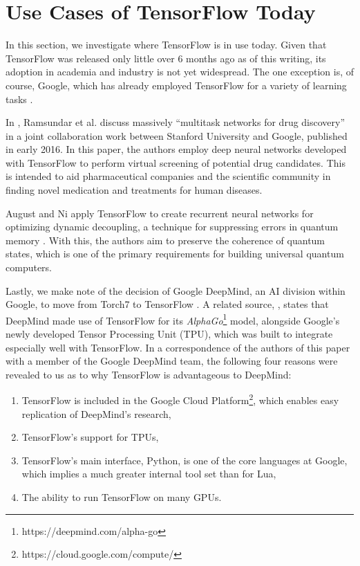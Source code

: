 \section{Use Cases of TensorFlow Today}\label{sec:uses}

In this section, we investigate where TensorFlow is in use today. Given that
TensorFlow was released only little over 6 months ago as of this writing, its
adoption in academia and industry is not yet widespread. The one exception is,
of course, Google, which has already employed TensorFlow for a variety of
learning tasks \cite{phones, emails, drugs, inception}.

In \cite{drugs}, Ramsundar et al. discuss massively ``multitask networks for
drug discovery'' in a joint collaboration work between Stanford University and
Google, published in early 2016. In this paper, the authors employ deep neural
networks developed with TensorFlow to perform virtual screening of potential
drug candidates. This is intended to aid pharmaceutical companies and the
scientific community in finding novel medication and treatments for human
diseases.

August and Ni apply TensorFlow to create recurrent neural networks for
optimizing dynamic decoupling, a technique for suppressing errors in quantum
memory \cite{august}. With this, the authors aim to preserve the coherence of
quantum states, which is one of the primary requirements for building universal
quantum computers.

Lastly, we make note of the decision of Google DeepMind, an AI division within
Google, to move from Torch7 to TensorFlow \cite{deepmind}. A related source,
\cite{tpu}, states that DeepMind made use of TensorFlow for its
\emph{AlphaGo}\footnote{https://deepmind.com/alpha-go} model, alongside Google's
newly developed Tensor Processing Unit (TPU), which was built to integrate
especially well with TensorFlow. In a correspondence of the authors of this
paper with a member of the Google DeepMind team, the following four reasons were
revealed to us as to why TensorFlow is advantageous to DeepMind:

\begin{enumerate}
\item TensorFlow is included in the Google Cloud
  Platform\footnote{https://cloud.google.com/compute/}, which enables easy
  replication of DeepMind's research,
\item TensorFlow's support for TPUs,
\item TensorFlow's main interface, Python, is one of the core languages at
  Google, which implies a much greater internal tool set than for Lua,
\item The ability to run TensorFlow on many GPUs.
\end{enumerate}

